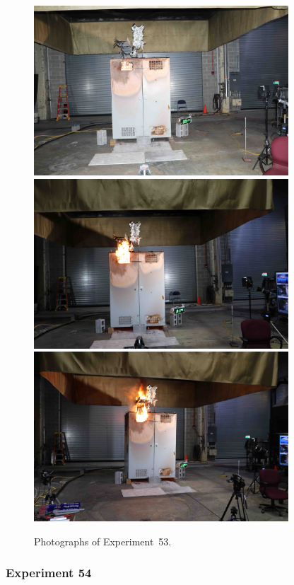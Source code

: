 \begin{figure}[p]
\centering
\includegraphics[height=2.50in]{../FIGURES/Test_53_5_min_24_s} \\
\includegraphics[height=2.50in]{../FIGURES/Test_53_11_min_45_s} \\
\includegraphics[height=2.50in]{../FIGURES/Test_53_ignition}
\caption[Photographs of Experiment~53]{Photographs of Experiment~53.}
\label{fig:Test_53_photos}
\end{figure}


\clearpage

\subsubsection{Experiment 54}

